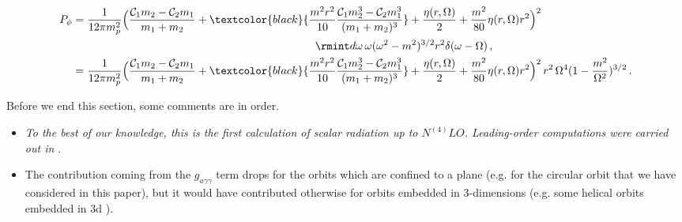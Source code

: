 \begin{tcolorbox}[thesisresultbox,, title=Scalar Radiation Power]
\restorethesisbodyformat
\begin{equation}
\begin{aligned}
        P_{\phi}&=\frac{1}{12\pi m_p^2 }\Big(\frac{\mathcal{C}_1 m_2-\mathcal{C}_2 m_1}{m_1+m_2}+\textcolor{black}{\frac{m^2 r^2}{10}\frac{\mathcal{C}_1m_2^3-\mathcal{C}_2 m_1^3}{(m_1+m_2)^3} }+\frac{\eta(r,\Omega)}{2}+\frac{m^2}{80}\eta(r,\Omega)r^2\Big)^2\\&\,\,\,\,\,\,\,\,\,\,\,\,\,\,\,\,\,\,\,\,\,\,\,\,\,\,\,\,\,\,\,\,\,\,\,\,\,\,\,\,\,\,\,\,\,\,\,\,\,\,\,\,\,\,\,\,\,\,\,\,\,\,\,\,\,\,\,\,\,\,\,\,\,\,\,\,\,\,\,\,\,\,\,\,\,\,\,\,\,\,\,\,\,\,\,\,\,\,\,\,\,\,\,\,\,\,\,\,\,\,\,\,\,\,\,\,\,\,\,\,\,\,\,\,\,\,\,\,\,\,\,\,\rmint d\omega \,\omega (\omega^2-m^2)^{3/2} r^2\delta(\omega-\Omega)\,,\\ &
        =\frac{1}{12\pi m_p^2 }\Big(\frac{\mathcal{C}_1 m_2-\mathcal{C}_2 m_1}{m_1+m_2}+\textcolor{black}{\frac{m^2r^2}{10}\frac{\mathcal{C}_1m_2^3-\mathcal{C}_2 m_1^3}{(m_1+m_2)^3} }+\frac{\eta(r,\Omega)}{2}+\frac{m^2}{80}\eta(r,\Omega)r^2\Big)^2\,r^2 \, \Omega^4 (1-\frac{m^2}{\Omega^2})^{3/2}\,.
\end{aligned}
\end{equation}
\end{tcolorbox}
Before we end this section, some comments are in order. 
\begin{itemize}
   \item  \textit{To the best of our knowledge, this is the first calculation of scalar radiation up to $N^{(4)}LO$. Leading-order computations were carried out in \cite{Huang:2018pbu, Kuntz:2019zef}}.
    \item The contribution coming from the $g_{a\gamma\gamma}$ term drops for the  orbits which are confined to a plane (e.g. for the circular orbit that we have considered in this paper), but it would have contributed otherwise for orbits embedded in 3-dimensions (e.g. some helical orbits embedded in 3d \cite{2021EPJC...81.1048L,Chen:2022qvg,Liu:2020vsy}).
\end{itemize}
